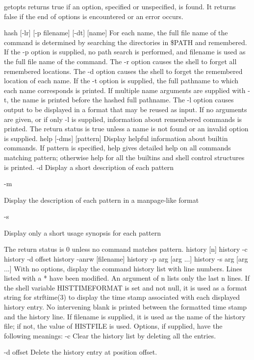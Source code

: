 {getopts returns true if an option, specified or unspecified, is found. It returns false if the end of options is encountered or an error occurs.

hash [-lr] [-p filename] [-dt] [name]
For each name, the full file name of the command is determined by searching the directories in \$PATH and remembered. If the -p option is supplied, no path search is performed, and filename is used as the full file name of the command. The -r option causes the shell to forget all remembered locations. The -d option causes the shell to forget the remembered location of each name. If the -t option is supplied, the full pathname to which each name corresponds is printed. If multiple name arguments are supplied with -t, the name is printed before the hashed full pathname. The -l option causes output to be displayed in a format that may be reused as input. If no arguments are given, or if only -l is supplied, information about remembered commands is printed. The return status is true unless a name is not found or an invalid option is supplied.
help [-dms] [pattern]
Display helpful information about builtin commands. If pattern is specified, help gives detailed help on all commands matching pattern; otherwise help for all the builtins and shell control structures is printed.
-d
Display a short description of each pattern

-m

Display the description of each pattern in a manpage-like format

-s

Display only a short usage synopsis for each pattern

The return status is 0 unless no command matches pattern.
history [n]
history -c
history -d offset
history -anrw [filename]
history -p arg [arg ...]
history -s arg [arg ...]
With no options, display the command history list with line numbers. Lines listed with a * have been modified. An argument of n lists only the last n lines. If the shell variable HISTTIMEFORMAT is set and not null, it is used as a format string for strftime(3) to display the time stamp associated with each displayed history entry. No intervening blank is printed between the formatted time stamp and the history line. If filename is supplied, it is used as the name of the history file; if not, the value of HISTFILE is used. Options, if supplied, have the following meanings:
-c
Clear the history list by deleting all the entries.

-d offset
Delete the history entry at position offset.

}
